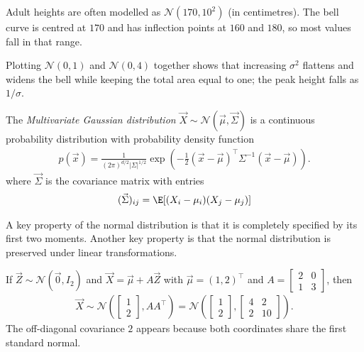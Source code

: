 \documentclass[a4paper, 12pt]{book}
\begin{document}
\begin{example}[Heights]
    Adult heights are often modelled as $\mathscr{N}(170,10^2)$ (in centimetres). The bell curve is centred at $170$ and has inflection points at $160$ and $180$, so most values fall in that range.
\end{example}

\begin{example}
    Plotting $\mathscr{N}(0,1)$ and $\mathscr{N}(0,4)$ together shows that increasing $\sigma^2$ flattens and widens the bell while keeping the total area equal to one; the peak height falls as $1/\sigma$.
\end{example}

\begin{definition}
    The \emph{Multivariate Gaussian distribution} $\vec{X} \sim \mathscr{N}(\vec{\mu}, \vec{\Sigma})$ is a continuous probability distribution with probability density function
    \begin{align}
    p(\vec{x}) = \frac{1}{(2\pi)^{d/2}|{\Sigma}|^{1/2}}
    \exp\!\left(-\frac{1}{2}(\vec{x}-\vec{\mu})^\top
    {\Sigma}^{-1}(\vec{x}-\vec{\mu})\right).
    \end{align}
    where $\vec{\Sigma}$ is the covariance matrix with entries
    \begin{align}
        (\vec{\Sigma})_{ij} = \E[(X_i - \mu_i)(X_j - \mu_j)]
    \end{align}
\end{definition}
A key property of the normal distribution is that it is completely specified by its first two moments. Another key property is that the normal distribution is preserved under linear transformations. 

\begin{example}
    If $\vec Z\sim\mathscr{N}(\vec 0,I_2)$ and $\vec X=\vec\mu+A\vec Z$ with $\vec\mu=(1,2)^\top$ and $A=\begin{bmatrix}2&0\\1&3\end{bmatrix}$, then
    \begin{align}
        \vec X\sim\mathscr{N}\!\left(\begin{bmatrix}1\\2\end{bmatrix}, AA^\top\right)
        = \mathscr{N}\!\left(\begin{bmatrix}1\\2\end{bmatrix},
        \begin{bmatrix}4&2\\2&10\end{bmatrix}\right).
    \end{align}
    The off-diagonal covariance $2$ appears because both coordinates share the first standard normal.
\end{example}
\end{document}
